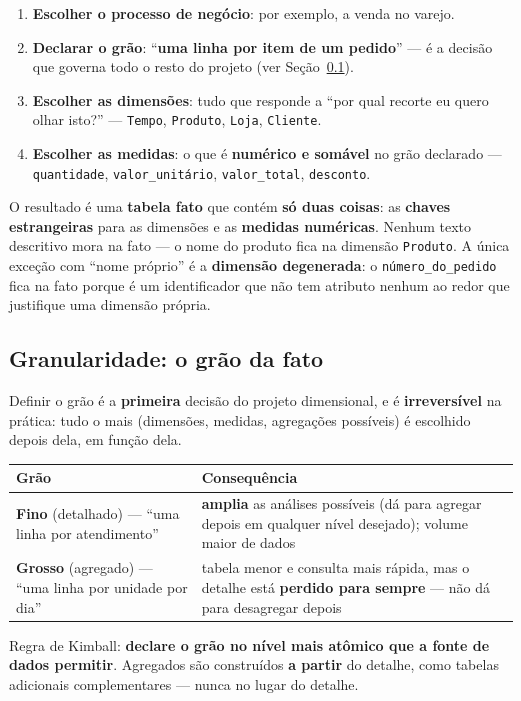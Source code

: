 \begin{conceito}
\begin{enumerate}
\item \textbf{Escolher o processo de negócio}: por exemplo, a venda no
varejo.
\item \textbf{Declarar o grão}: “\textbf{uma linha por item de um
pedido}” --- é a decisão que governa todo o resto do projeto (ver
Seção~\ref{sec:granularidade}).
\item \textbf{Escolher as dimensões}: tudo que responde a “por qual
recorte eu quero olhar isto?” --- \texttt{Tempo}, \texttt{Produto},
\texttt{Loja}, \texttt{Cliente}.
\item \textbf{Escolher as medidas}: o que é \textbf{numérico e somável}
no grão declarado --- \texttt{quantidade}, \texttt{valor\_unitário},
\texttt{valor\_total}, \texttt{desconto}.
\end{enumerate}

O resultado é uma \textbf{tabela fato} que contém \textbf{só duas
coisas}: as \textbf{chaves estrangeiras} para as dimensões e as
\textbf{medidas numéricas}. Nenhum texto descritivo mora na fato --- o
nome do produto fica na dimensão \texttt{Produto}. A única exceção com
“nome próprio” é a \textbf{dimensão degenerada}: o
\texttt{número\_do\_pedido} fica na fato porque é um identificador que não
tem atributo nenhum ao redor que justifique uma dimensão própria.
\end{conceito}

\subsection{Granularidade: o grão da fato}
\label{sec:granularidade}

\begin{conceito}
Definir o grão é a \textbf{primeira} decisão do projeto dimensional, e é
\textbf{irreversível} na prática: tudo o mais (dimensões, medidas,
agregações possíveis) é escolhido depois dela, em função dela.

\begin{center}
\begin{tabular}{@{}p{3.4cm}p{7.6cm}@{}}
\toprule
\textbf{Grão} & \textbf{Consequência} \\
\midrule
\textbf{Fino} (detalhado) --- “uma linha por atendimento” & \textbf{amplia}
as análises possíveis (dá para agregar depois em qualquer nível desejado);
volume maior de dados \\
\textbf{Grosso} (agregado) --- “uma linha por unidade por dia” & tabela
menor e consulta mais rápida, mas o detalhe está \textbf{perdido para
sempre} --- não dá para desagregar depois \\
\bottomrule
\end{tabular}
\end{center}

Regra de Kimball: \textbf{declare o grão no nível mais atômico que a fonte
de dados permitir}. Agregados são construídos \textbf{a partir} do
detalhe, como tabelas adicionais complementares --- nunca no lugar do
detalhe.
\end{conceito}

